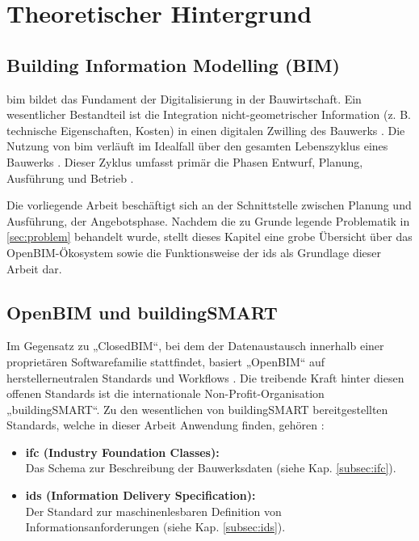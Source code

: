 \section{Theoretischer Hintergrund}
\label{sec:theory}

\subsection{Building Information Modelling (BIM)}

\gls{bim} bildet das Fundament der Digitalisierung in der Bauwirtschaft. 
Ein wesentlicher Bestandteil ist die Integration nicht-geometrischer Information (z. B. technische Eigenschaften, Kosten) 
in einen digitalen Zwilling des Bauwerks \cite{borrmann2015building}. Die Nutzung von \gls{bim} verläuft im 
Idealfall über den gesamten Lebenszyklus eines Bauwerks \cite{ISO19650:2018}. 
Dieser Zyklus umfasst primär die Phasen Entwurf, Planung, Ausführung und Betrieb \cite{sacks2018bim}.

Die vorliegende Arbeit beschäftigt sich an der Schnittstelle zwischen 
Planung und Ausführung, der Angebotsphase. Nachdem die zu Grunde legende Problematik 
in \ref{sec:problem} behandelt wurde, stellt dieses Kapitel eine grobe Übersicht über 
das OpenBIM-Ökosystem sowie die Funktionsweise der \gls{ids} als Grundlage dieser Arbeit dar.


\subsection{OpenBIM und buildingSMART}
\label{subsec:openbim}
Im Gegensatz zu „ClosedBIM“, bei dem der Datenaustausch innerhalb einer proprietären 
Softwarefamilie stattfindet, basiert „OpenBIM“ auf herstellerneutralen 
Standards und Workflows \cite{borrmann2015building}. Die treibende Kraft hinter diesen offenen 
Standards ist die internationale Non-Profit-Organisation „buildingSMART“. Zu den 
wesentlichen von buildingSMART bereitgestellten Standards, welche in dieser Arbeit Anwendung 
finden, gehören \cite{eichler2024bimcert}:

\begin{itemize}
    \item \textbf{\gls{ifc} (Industry Foundation Classes):} \\
    Das Schema zur Beschreibung der Bauwerksdaten (siehe Kap. \ref{subsec:ifc}).
    \item \textbf{\gls{ids} (Information Delivery Specification):} \\
    Der Standard zur maschinenlesbaren Definition von Informationsanforderungen 
    (siehe Kap. \ref{subsec:ids}).
\end{itemize}

